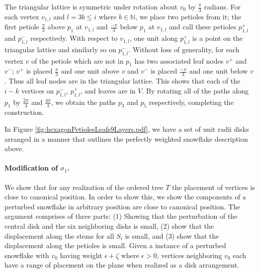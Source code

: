 \documentclass[10pt]{CSUNthesis}
\theoremstyle{plain}%
\theoremstyle{definition}
\theoremstyle{remark}
\newcommand{\bbN}{{\mathbb{N}}}
\begin{document}
The triangular lattice is symmetric under rotation about $v_0$ by $\frac{\pi}{3}$ radians.  
For each vertex $v_{1,l}$ and $l = 3 b \leq i$ where $b \in \bbN$, we place two petioles from it; the first petiole $\frac{\pi}{3}$ above $p_1$ at $v_{1,l}$ and $\frac{-\pi}{3}$ below $p_1$ at $v_{1,l}$ and call these petioles $p_{1,l}^+$ and $p_{1,l}^-$ respectively.  
With respect to $v_{1,l}$, one unit along $p_{1,l}^+$ is a point on the triangular lattice and similarly so on $p_{1,l}^-$.  
Without loss of generality, for each vertex $v$ of the petiole which are not in $p_1$ has two associated leaf nodes $v^+$ and $v^-$; $v^+$ is placed $\frac{\pi}{3}$ and one unit above $v$ and $v^-$ is placed $\frac{-\pi}{3}$ and one unit below $v$.  
Thus all leaf nodes are in the triangular lattice.
This shows that each of the $i-k$ vertices on $p_{1,l}^-$, $p_{1,l}^+$, and leaves are in $V$.
By rotating all of the paths along $p_1$ by $\frac{2\pi}{3}$ and $\frac{4\pi}{3}$, we obtain the paths $p_3$ and $p_5$ respectively, completing the construction.

In Figure \ref{fig:hexagonPetiolesLeafs9Layers.pdf}, we have a set of unit radii disks arranged in a manner that outlines the perfectly weighted snowflake description above.

\paragraph{Modification of $\sigma_1$.}
We show that for any realization of the ordered tree $T$
 the placement of vertices is close to canonical position.  
In order to show this, we show the components of a perturbed snowflake in arbitrary position  are close to canonical position.  
The argument comprises of three parts: (1) Showing that the perturbation of the central disk and the six neighboring disks is small, (2) show that the displacement along the stems for all $S_i$ is small, and (3) show that the displacement along the petioles is small.  
Given a instance of a perturbed snowflake with $v_0$ having weight $\epsilon + \zeta$ where $\epsilon > 0$, vertices neighboring $v_0$ each have a range of placement on the plane when realized as a disk arrangement. 
\end{document}
